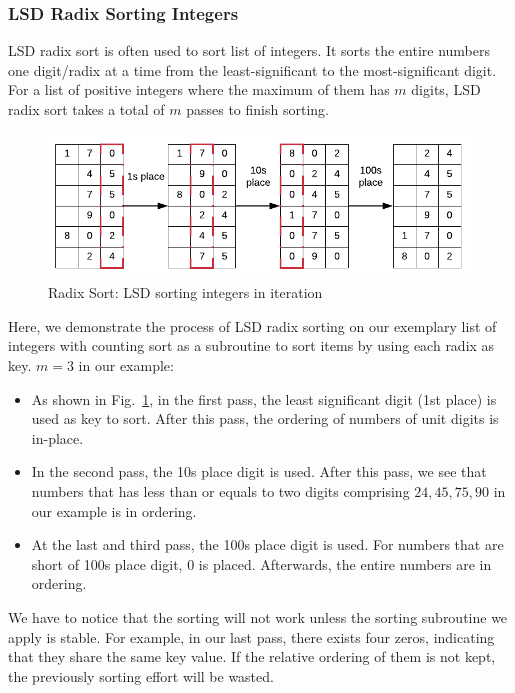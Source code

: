 \documentclass[../main.tex]{subfiles}
\begin{document}
\subsubsection{LSD Radix Sorting Integers} 
LSD radix sort is often used to sort list of integers.  It  sorts the entire numbers one digit/radix at a time from the least-significant to the most-significant digit. For a list of positive integers where the maximum of them has $m$ digits, LSD radix sort takes a total of $m$ passes to finish sorting. 

\begin{figure}[!ht]
    \centering
    \includegraphics[width=0.98\columnwidth]{fig/lsd_radix_integer_sort.png}
    \caption{Radix Sort: LSD sorting integers in iteration}
        \label{fig:lsd_radix_integer_sort}
\end{figure}

Here, we demonstrate the process of LSD radix sorting on our exemplary list of integers with counting sort as a subroutine to sort items by using each radix as key. $m=3$ in our example:
\begin{itemize}
    \item As shown in Fig.~\ref{fig:lsd_radix_integer_sort}, in the first pass, the least significant digit (1st place) is used as key to sort.  After this pass, the ordering of numbers of unit digits is in-place. 
    \item In the second pass, the 10s place digit is used. After this pass, we see that numbers that has less than or equals to two digits comprising $24, 45, 75, 90$ in our example is in ordering. 
    \item At the last and third pass, the 100s place digit is used. For numbers that are short of 100s place digit, 0 is placed. Afterwards, the entire numbers are in ordering. 
\end{itemize}
We have to notice that the sorting will not work unless the sorting subroutine we apply is stable. For example, in our last pass, there exists four zeros, indicating that they share the same key value. If the relative ordering of them is not kept, the previously sorting effort will be wasted. 
\end{document}
